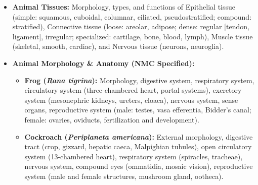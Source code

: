 \documentclass[11pt,a4paper]{article}
\begin{document}
\begin{itemize}
  \item \textbf{Animal Tissues:} Morphology, types, and functions of Epithelial tissue (simple: squamous, cuboidal, columnar, ciliated, pseudostratified; compound: stratified), Connective tissue (loose: areolar, adipose; dense: regular [tendon, ligament], irregular; specialized: cartilage, bone, blood, lymph), Muscle tissue (skeletal, smooth, cardiac), and Nervous tissue (neurons, neuroglia).
  \item \textbf{Animal Morphology \& Anatomy (NMC Specified):}
  \begin{itemize}
    \item \textbf{Frog (\textit{Rana tigrina}):} Morphology, digestive system, respiratory system, circulatory system (three-chambered heart, portal systems), excretory system (mesonephric kidneys, ureters, cloaca), nervous system, sense organs, reproductive system (male: testes, vasa efferentia, Bidder's canal; female: ovaries, oviducts, fertilization and development).
    \item \textbf{Cockroach (\textit{Periplaneta americana}):} External morphology, digestive tract (crop, gizzard, hepatic caeca, Malpighian tubules), open circulatory system (13-chambered heart), respiratory system (spiracles, tracheae), nervous system, compound eyes (ommatidia, mosaic vision), reproductive system (male and female structures, mushroom gland, ootheca).
  \end{itemize}
\end{itemize}
\end{document}
